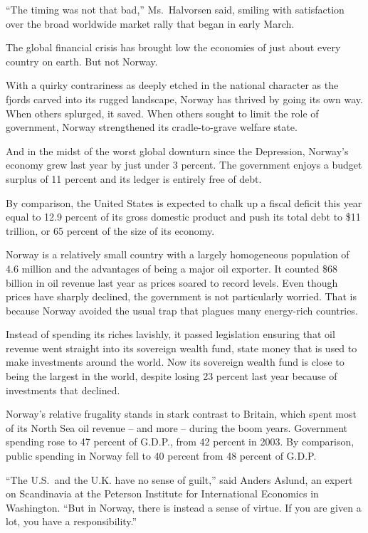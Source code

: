\documentclass[12pt,a4paper,onecolumn]{article}
\begin{document}
``The timing was not that bad,'' Ms.~Halvorsen said, smiling with satisfaction over the broad
worldwide market rally that began in early March.

The global financial crisis has brought low the economies of just about every country on earth. But
not Norway.

With a quirky contrariness as deeply etched in the national character as the fjords carved into its
rugged landscape, Norway has thrived by going its own way. When others splurged, it saved. When
others sought to limit the role of government, Norway strengthened its cradle-to-grave welfare
state.

And in the midst of the worst global downturn since the Depression, Norway's economy grew last year
by just under 3 percent. The government enjoys a budget surplus of 11 percent and its ledger is
entirely free of debt.

By comparison, the United States is expected to chalk up a fiscal deficit this year equal to 12.9
percent of its gross domestic product and push its total debt to \$11 trillion, or 65 percent of the
size of its economy.

Norway is a relatively small country with a largely homogeneous population of 4.6 million and the
advantages of being a major oil exporter. It counted \$68 billion in oil revenue last year as prices
soared to record levels. Even though prices have sharply declined, the government is not
particularly worried. That is because Norway avoided the usual trap that plagues many energy-rich
countries.

Instead of spending its riches lavishly, it passed legislation ensuring that oil revenue went
straight into its sovereign wealth fund, state money that is used to make investments around the
world. Now its sovereign wealth fund is close to being the largest in the world, despite losing 23
percent last year because of investments that declined.

Norway's relative frugality stands in stark contrast to Britain, which spent most of its North Sea
oil revenue -- and more -- during the boom years. Government spending rose to 47 percent of G.D.P.,
from 42 percent in 2003. By comparison, public spending in Norway fell to 40 percent from 48 percent
of G.D.P.

``The U.S.~and the U.K. have no sense of guilt,'' said Anders Aslund, an expert on Scandinavia at
the Peterson Institute for International Economics in Washington. ``But in Norway, there is instead
a sense of virtue. If you are given a lot, you have a responsibility.''
\end{document}
